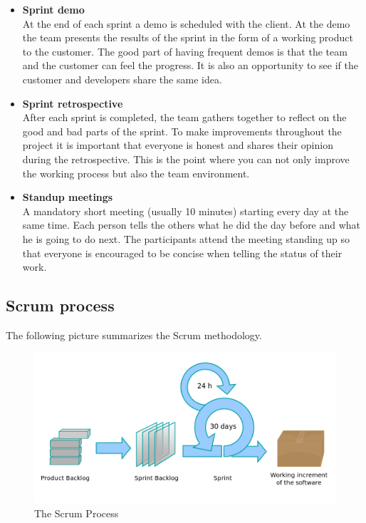 \begin{itemize}
\item{\textbf{Sprint demo}}\\
At the end of each sprint a demo is scheduled with the client. At the demo the team presents the results of the sprint 
in the form of a working product to the customer. The good part of having frequent demos is that the team and the customer can
feel the progress. It is also an opportunity to see if the customer and developers share the same idea.

\item{\textbf{Sprint retrospective}}\\
After each sprint is completed, the team gathers together to reflect on the good and bad parts of the sprint.
To make improvements throughout the project it is important that everyone is honest and shares their opinion during the retrospective.
This is the point where you can not only improve the working process but also the team environment.

\item{\textbf{Standup meetings}}\\
A mandatory short meeting (usually 10 minutes) starting every day at the same time.
Each person tells the others what he did the day before and what he is going to do
next. The participants attend the meeting standing up so that everyone is encouraged to be concise
when telling the status of their work.

\end{itemize}
\pagebreak

\subsection{Scrum process}
The following picture summarizes the Scrum methodology.

\begin{figure}[!h]
\centering
\includegraphics[scale=0.35]{graphics/scrum.png}
\caption{The Scrum Process}\label{fig:scrum_process}
\end{figure}
